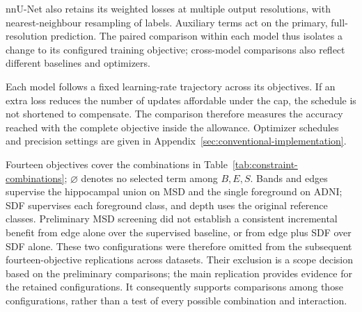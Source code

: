 nnU-Net also retains its weighted losses at multiple output resolutions,
with nearest-neighbour resampling of labels. Auxiliary terms act on
the primary, full-resolution prediction. The paired comparison within
each model thus isolates a change to its configured training objective;
cross-model comparisons also reflect different baselines and optimizers.

Each model follows a fixed learning-rate trajectory across its
objectives. If an extra loss reduces the number of updates affordable
under the cap, the schedule is not shortened to compensate. The
comparison therefore measures the accuracy reached with the complete
objective inside the allowance. Optimizer schedules and precision
settings are given in Appendix~\ref{sec:conventional-implementation}.

Fourteen objectives cover the combinations in
Table~\ref{tab:constraint-combinations}; $\varnothing$ denotes no
selected term among $B,E,S$. Bands and edges supervise
the hippocampal union on MSD and the single foreground on ADNI; SDF
supervises each foreground class, and depth
uses the original reference classes. Preliminary MSD screening did not
establish a consistent incremental benefit from edge alone over the
supervised baseline, or from edge plus SDF over SDF alone. These two
configurations were therefore omitted from the subsequent
fourteen-objective replications across datasets. Their exclusion is a
scope decision based on the preliminary comparisons; the main replication
provides evidence for the retained configurations. It consequently
supports comparisons among those configurations, rather than a test of every possible combination and interaction.

